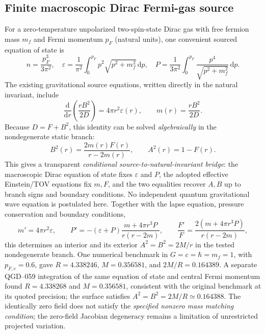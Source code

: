\documentclass[11pt,a4paper]{article}
\newcommand{\dd}{\mathrm d}
\begin{document}
\subsection{Finite macroscopic Dirac Fermi-gas source}
For a zero-temperature unpolarized two-spin-state Dirac gas with free fermion mass $m_f$ and Fermi momentum $p_F$ (natural units), one convenient sourced equation of state is
\begin{equation}\label{eq:dirac-eos}
 n=\frac{p_F^3}{3\pi^2},\quad
 \varepsilon=\frac1{\pi^2}\int_0^{p_F}p^2\sqrt{p^2+m_f^2}\,\dd p,\quad
 P=\frac1{3\pi^2}\int_0^{p_F}\frac{p^4}{\sqrt{p^2+m_f^2}}\,\dd p.
\end{equation}
The existing gravitational source equations, written directly in the natural invariant, include
\begin{equation}\label{eq:qgd-mass-source}
\boxed{\frac{\dd}{\dd r}\left(\frac{rB^2}{2D}\right)=4\pi r^2\varepsilon(r),\qquad
 m(r)=\frac{rB^2}{2D}.}
\end{equation}
Because $D=F+B^2$, this identity can be solved \emph{algebraically} in the nondegenerate static branch:
\begin{equation}\label{eq:qgd060-star-bridge}
 \boxed{B^2(r)=\frac{2m(r)F(r)}{r-2m(r)},\qquad A^2(r)=1-F(r).}
\end{equation}
This gives a transparent \emph{conditional source-to-natural-invariant bridge}: the macroscopic Dirac equation of state fixes $\varepsilon$ and $P$, the adopted effective Einstein/TOV equations fix $m,F$, and the two equalities recover $A,B$ up to branch signs and boundary conditions.  No independent quantum gravitational wave equation is postulated here.
Together with the lapse equation, pressure conservation and boundary conditions,
\begin{equation}\label{eq:tov}
 m'=4\pi r^2\varepsilon,\qquad
 P'=-(\varepsilon+P)\frac{m+4\pi r^3P}{r(r-2m)},\qquad
 \frac{F'}F=\frac{2(m+4\pi r^3P)}{r(r-2m)},
\end{equation}
this determines an interior and its exterior $A^2=B^2=2M/r$ in the tested nondegenerate branch. One numerical benchmark in $G=c=\hbar=m_f=1$, with $p_{F,c}=0.6$, gave $R=4.338246$, $M=0.356581$, and $2M/R=0.164389$.  A separate QGD--059 integration of the same equation of state and central Fermi momentum found $R=4.338268$ and $M=0.356581$, consistent with the original benchmark at its quoted precision; the surface satisfies $A^2=B^2=2M/R\simeq0.164388$. The identically zero field does not satisfy the \emph{specified nonzero mass matching condition}; the zero-field Jacobian degeneracy remains a limitation of unrestricted projected variation.
\end{document}
